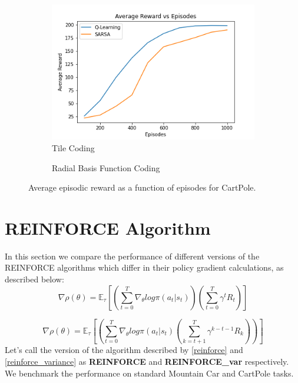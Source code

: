 \documentclass{article}
\begin{document}
        \begin{figure}[H]
            \graphicspath{ {../Experiments/Linear_Function_Approximation/} }
            \centering
            \begin{subfigure}{.5\textwidth}
              \centering
              \includegraphics[width=\linewidth]{Cartpole_tile.png}
              \caption{Tile Coding}
              \label{cartpole_tile}
            \end{subfigure}%
            \begin{subfigure}{.5\textwidth}
              \centering
              \caption{Radial Basis Function Coding}
              \label{mountaincar_radial}
            \end{subfigure}
            \caption{Average episodic reward as a function of episodes for CartPole.}
            \end{figure}

\section{REINFORCE Algorithm}
    In this section we compare the performance
    of different versions of the REINFORCE algorithms which differ in their policy gradient calculations, as described below:
    \begin{equation}
        \nabla \rho(\theta) = \mathbb{E}_{\tau} \left [\left ( \sum_{t=0}^{T} \nabla_{\theta} log \pi (a_{t} | s_{t}) \right) \left ( \sum_{t=0}^{T} \gamma^{t} R_{t} \right) \right ]
    \label{reinforce}
    \end{equation}

    \begin{equation}
        \nabla \rho(\theta) = \mathbb{E}_{\tau} \left [\left ( \sum_{t=0}^{T} \nabla_{\theta} log \pi (a_{t} | s_{t}) \left ( \sum_{k=t+1}^{T} \gamma^{k-t-1} R_{k} \right) \right) \right ]
    \label{reinforce_variance}
    \end{equation}
    Let's call the version of the algorithm described by \ref{reinforce} and \ref{reinforce_variance} as \textbf{REINFORCE} and \textbf{REINFORCE\_var} respectively.
    We benchmark the performance on standard Mountain Car and CartPole tasks. 
\end{document}
